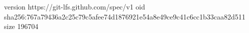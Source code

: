 version https://git-lfs.github.com/spec/v1
oid sha256:767a79436a2c25c79c5afee74d1876921e54a8e49ce9c41c6cc1b33caa82d511
size 196704
